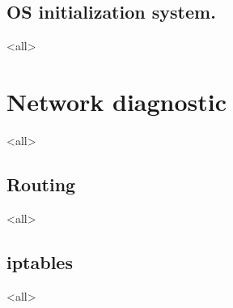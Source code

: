 \subsection{OS initialization system.}
\mode<all>{}



\section{Network diagnostic}
\mode<all>{}
\subsection{Routing}
\mode<all>{}
\subsection{iptables}
\mode<all>{}


